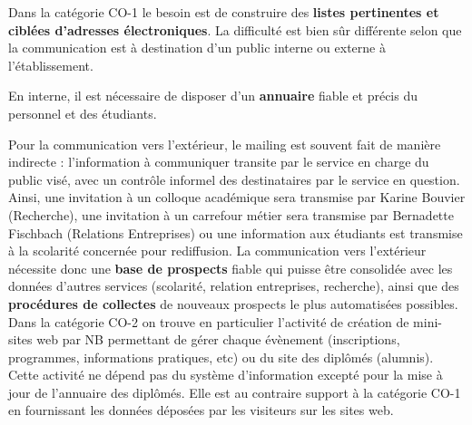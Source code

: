 \documentclass{book}
\begin{document}
Dans la catégorie CO-1 le besoin est de construire des \textbf{listes 
pertinentes et ciblées d'adresses électroniques}. La difficulté
est bien sûr différente selon que la communication est à destination
d'un public interne ou externe à l'établissement.

En interne, il est nécessaire de disposer d'un \textbf{annuaire}
fiable et précis du personnel et des étudiants. 

Pour la communication vers l'extérieur, le mailing est souvent 
fait de manière indirecte : l'information à communiquer transite par
le service en charge du public visé, avec un contrôle informel des 
destinataires par le service en question. Ainsi, une invitation à un 
colloque académique sera transmise par Karine Bouvier (Recherche),
une invitation à un carrefour métier sera transmise par Bernadette 
Fischbach (Relations Entreprises) ou une information aux étudiants
est transmise à la scolarité concernée pour rediffusion. La communication 
vers l'extérieur nécessite donc une \textbf{base de prospects} fiable 
qui puisse être consolidée avec les données d'autres services (scolarité, 
relation entreprises, recherche), ainsi que des \textbf{procédures 
de collectes} de nouveaux prospects le plus automatisées possibles.\\

Dans la catégorie CO-2 on trouve en particulier l'activité de création
de mini-sites web par NB permettant de gérer chaque évènement (inscriptions,
programmes, informations pratiques, etc) ou du site des diplômés (alumnis).
Cette activité ne dépend pas du système d'information excepté pour
la mise à jour de l'annuaire des diplômés. Elle est au contraire 
support à la catégorie CO-1 en fournissant les données déposées par les
visiteurs sur les sites web.\\ 
\end{document}
